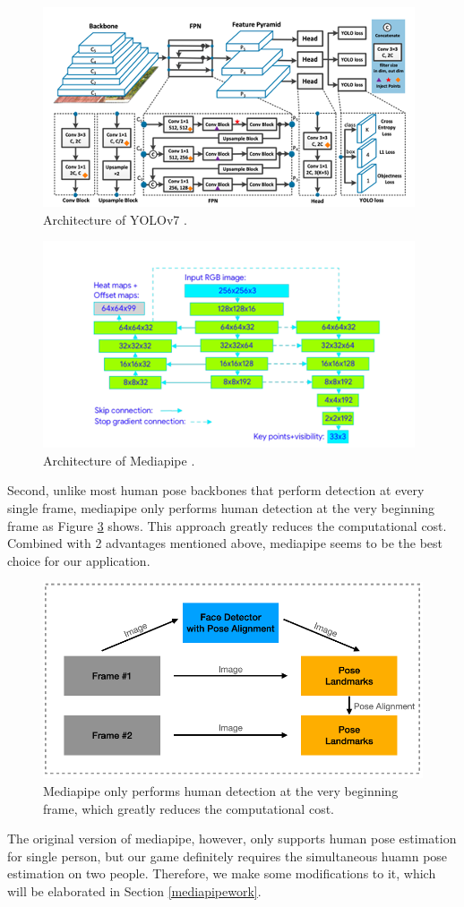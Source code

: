\begin{figure}[ht]
    \centering
    \includegraphics[scale=.6]{fig/yolo_arch.png}
    \caption{Architecture of YOLOv7 \cite{wang2022yolov7}.}
    \label{fig:yolo_arch}
\end{figure}

\begin{figure}[ht]
    \centering
    \includegraphics[scale=.6]{fig/mp_arch.png}
    \caption{Architecture of Mediapipe \cite{lugaresi2019mediapipe}.}
    \label{fig:mp_arch}
\end{figure}

Second, unlike most human pose backbones that perform detection at every single frame, mediapipe only performs human detection at the very beginning frame as Figure \ref{fig:mp_det} shows. This approach greatly reduces the computational cost. Combined with 2 advantages mentioned above, mediapipe seems to be the best choice for our application.

\begin{figure}[ht]
    \centering
    \includegraphics[scale=.5]{fig/mp_det.png}
    \caption{Mediapipe only performs human detection at the very beginning frame, which greatly reduces the computational cost.}
    \label{fig:mp_det}
\end{figure}

The original version of mediapipe, however, only supports human pose estimation for single person, but our game definitely requires the simultaneous huamn pose estimation on two people. Therefore, we make some modifications to it, which will be elaborated in Section \ref{mediapipework}.